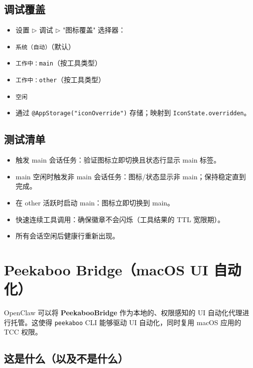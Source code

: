 \subsection{调试覆盖}


\begin{itemize}
  \item 设置 $\triangleright$ 调试 $\triangleright$ "图标覆盖" 选择器：
  \item \texttt{系统（自动）}（默认）
  \item \texttt{工作中：main}（按工具类型）
  \item \texttt{工作中：other}（按工具类型）
  \item \texttt{空闲}
  \item 通过 \texttt{@AppStorage("iconOverride")} 存储；映射到 \texttt{IconState.overridden}。
\end{itemize}


\subsection{测试清单}


\begin{itemize}
  \item 触发 main 会话任务：验证图标立即切换且状态行显示 main 标签。
  \item main 空闲时触发非 main 会话任务：图标/状态显示非 main；保持稳定直到完成。
  \item 在 other 活跃时启动 main：图标立即切换到 main。
  \item 快速连续工具调用：确保徽章不会闪烁（工具结果的 TTL 宽限期）。
  \item 所有会话空闲后健康行重新出现。
\end{itemize}



\clearpage

\section{Peekaboo Bridge（macOS UI 自动化）}


OpenClaw 可以将 \textbf{PeekabooBridge} 作为本地的、权限感知的 UI 自动化代理进行托管。这使得 \texttt{peekaboo} CLI 能够驱动 UI 自动化，同时复用 macOS 应用的 TCC 权限。

\subsection{这是什么（以及不是什么）}


